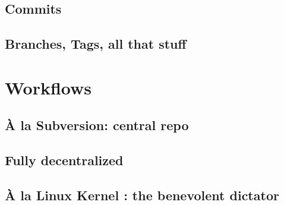 \documentclass{beamer}
\begin{document}
	\frame{


	}

	\subsection{Commits}


	\subsection{Branches, Tags, all that stuff}

	\section{Workflows}

	    \subsection{À la Subversion: central repo}

	    \subsection{Fully decentralized}

	    \subsection{À la Linux Kernel : the benevolent dictator}
\end{document}
